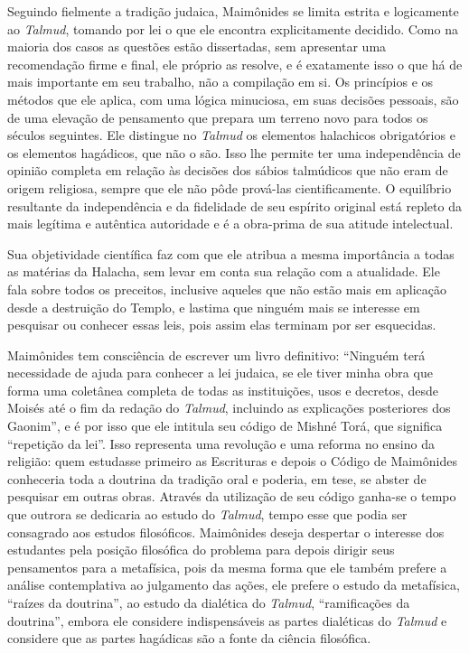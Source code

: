 Seguindo fielmente a tradição judaica, Maimônides se limita estrita e
logicamente ao \emph{Talmud}, tomando por lei o que ele encontra
explicitamente decidido. Como na maioria dos casos as questões estão
dissertadas, sem apresentar uma recomendação firme e final, ele próprio
as resolve, e é exatamente isso o que há de mais importante em seu
trabalho, não a compilação em si. Os princípios e os métodos que ele
aplica, com uma lógica minuciosa, em suas decisões pessoais, são de uma
elevação de pensamento que prepara um terreno novo para todos os séculos
seguintes. Ele distingue no \emph{Talmud} os elementos halachicos
obrigatórios e os elementos hagádicos, que não o são. Isso lhe permite
ter uma independência de opinião completa em relação às decisões dos
sábios talmúdicos que não eram de origem religiosa, sempre que ele não
pôde prová-las cientificamente. O equilíbrio resultante da independência
e da fidelidade de seu espírito original está repleto da mais legítima
e autêntica autoridade e é a obra-prima de sua atitude intelectual.

Sua objetividade científica faz com que ele atribua a mesma importância
a todas as matérias da Halacha, sem levar em conta sua relação com a
atualidade. Ele fala sobre todos os preceitos, inclusive aqueles que não
estão mais em aplicação desde a destruição do Templo, e lastima que
ninguém mais se interesse em pesquisar ou conhecer essas leis, pois
assim elas terminam por ser esquecidas.

Maimônides tem consciência de escrever um livro definitivo: ``Ninguém
terá necessidade de ajuda para conhecer a lei judaica, se ele tiver
minha obra que forma uma coletânea completa de todas as instituições,
usos e decretos, desde Moisés até o fim da redação do \emph{Talmud},
incluindo as explicações posteriores dos Gaonim'', e é por isso que ele
intitula seu código de Mishné Torá, que significa ``repetição da
lei''. Isso representa uma revolução e uma reforma no ensino da
religião: quem estudasse primeiro as Escrituras e depois o Código de
Maimônides conheceria toda a doutrina da tradição oral e poderia, em
tese, se abster de pesquisar em outras obras. Através da utilização de
seu código ganha-se o tempo que outrora se dedicaria ao estudo do
\emph{Talmud}, tempo esse que podia ser consagrado aos estudos
filosóficos. Maimônides deseja despertar o interesse dos estudantes pela
posição filosófica do problema para depois dirigir seus pensamentos para
a metafísica, pois da mesma forma que ele também prefere a análise
contemplativa ao julgamento das ações, ele prefere o estudo da
metafísica, ``raízes da doutrina'', ao estudo da dialética do
\emph{Talmud}, ``ramificações da doutrina'', embora ele considere
indispensáveis as partes dialéticas do \emph{Talmud} e considere que as
partes hagádicas são a fonte da ciência filosófica.

